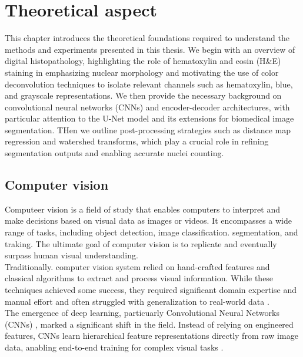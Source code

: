 \documentclass[target=bach,aauheader=,style=]{thud}
\begin{document}
\chapter{Theoretical aspect}
\label{sec:theory}
This chapter introduces the theoretical foundations required to understand the methods and experiments presented in this thesis. 
We begin with an overview of digital histopathology, highlighting the role of hematoxylin and eosin (H\&E) staining in emphasizing nuclear morphology and motivating the use of color deconvolution techniques to isolate relevant channels such as hematoxylin, blue, and grayscale representations. 
We then provide the necessary background on convolutional neural networks (CNNs) and encoder-decoder architectures, with particular attention to the U-Net model and its extensions for biomedical image segmentation. 
THen we outline post-processing strategies such as distance map regression and watershed transforms, which play a crucial role in refining segmentation outputs and enabling accurate nuclei counting.
\section{Computer vision}
Computeer vision is a field of study that enables computers to interpret and make decisions based on visual data as images or videos. It encompasses a wide range of tasks, including object detection, image classification. segmentation, and traking. The ultimate goal of computer vision is to replicate and eventually surpass human visual understanding. \\
Traditionally. computer vision system relied on hand-crafted features and classical algorithms to extract and process visual information. While these techniques achieved some success, they required significant domain expertise and manual effort and often struggled with generalization to real-world data \cite{lecun2015deep}.\\
The emergence of deep learning, particuarly Convolutional Neural Networks (CNNs) \cite{lecun1998gradient}, marked a significant shift in the field. Instead of relying on engineered features, CNNs learn hierarchical feature representations directly from raw image data, anabling end-to-end training for complex visual tasks \cite{krizhevsky2012imagenet}.
\end{document}
